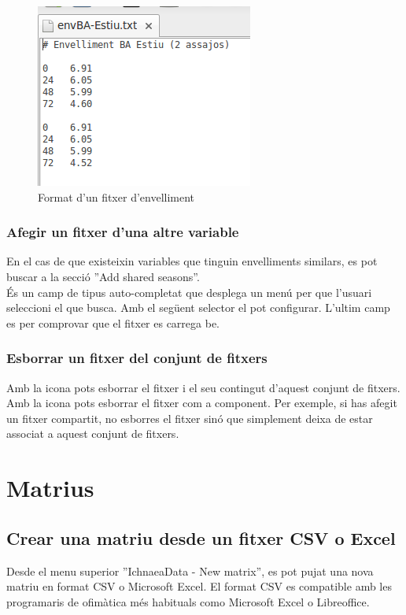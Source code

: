 \begin{figure}[h!]
  \centering
  \includegraphics[scale=0.5]{img/userguide/envelliment.png}
  \caption{Format d'un fitxer d'envelliment}
  \label{fig:envelliment}
\end{figure}

\subsubsection{Afegir un fitxer d'una altre variable}
En el cas de que existeixin variables que tinguin envelliments similars, es pot buscar a la secció ''Add shared seasons''.\\

\'{E}s un camp de tipus auto-completat que desplega un menú per que l'usuari seleccioni el que busca. Amb el següent selector el pot configurar. L'ultim camp es per comprovar que el fitxer es carrega be.

\subsubsection{Esborrar un fitxer del conjunt de fitxers}
Amb la icona \icontrash pots esborrar el fitxer i el seu contingut d'aquest conjunt de fitxers.\\
Amb la icona \iconremove pots esborrar el fitxer com a component. Per exemple, si has afegit un fitxer compartit, no esborres el fitxer sinó que simplement deixa de estar associat a aquest conjunt de fitxers.

\section{Matrius}

\subsection{Crear una matriu desde un fitxer CSV o Excel}
\label{sec:create_matrix}
Desde el menu superior ''IchnaeaData - New matrix'', es pot pujat una nova matriu en format CSV o Microsoft Excel. El format CSV es compatible amb les programaris de ofim\`{a}tica m\'{e}s habituals como Microsoft Excel o Libreoffice.

